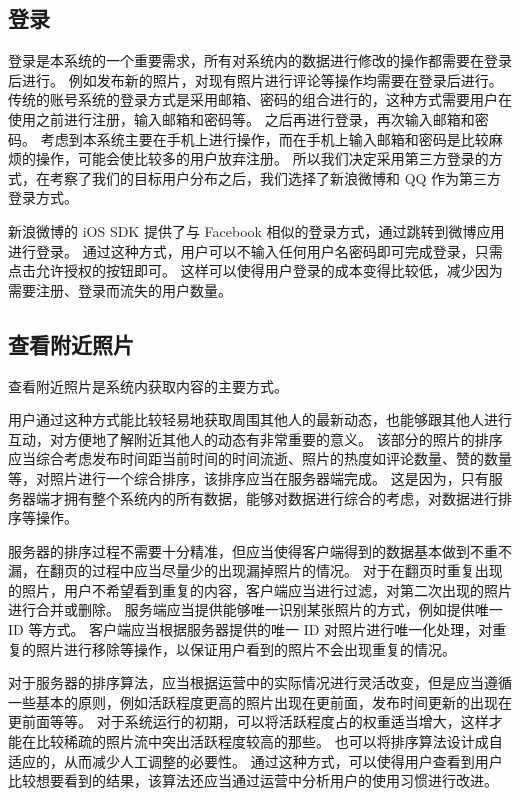 \subsection{登录}

登录是本系统的一个重要需求，所有对系统内的数据进行修改的操作都需要在登录后进行。
例如发布新的照片，对现有照片进行评论等操作均需要在登录后进行。
传统的账号系统的登录方式是采用邮箱、密码的组合进行的，这种方式需要用户在使用之前进行注册，输入邮箱和密码等。
之后再进行登录，再次输入邮箱和密码。
考虑到本系统主要在手机上进行操作，而在手机上输入邮箱和密码是比较麻烦的操作，可能会使比较多的用户放弃注册。
所以我们决定采用第三方登录的方式，在考察了我们的目标用户分布之后，我们选择了新浪微博和 QQ 作为第三方登录方式。

新浪微博的 iOS SDK 提供了与 Facebook 相似的登录方式，通过跳转到微博应用进行登录。
通过这种方式，用户可以不输入任何用户名密码即可完成登录，只需点击允许授权的按钮即可。
这样可以使得用户登录的成本变得比较低，减少因为需要注册、登录而流失的用户数量。

\subsection{查看附近照片}

查看附近照片是系统内获取内容的主要方式。

用户通过这种方式能比较轻易地获取周围其他人的最新动态，也能够跟其他人进行互动，对方便地了解附近其他人的动态有非常重要的意义。
该部分的照片的排序应当综合考虑发布时间距当前时间的时间流逝、照片的热度如评论数量、赞的数量等，对照片进行一个综合排序，该排序应当在服务器端完成。
这是因为，只有服务器端才拥有整个系统内的所有数据，能够对数据进行综合的考虑，对数据进行排序等操作。

服务器的排序过程不需要十分精准，但应当使得客户端得到的数据基本做到不重不漏，在翻页的过程中应当尽量少的出现漏掉照片的情况。
对于在翻页时重复出现的照片，用户不希望看到重复的内容，客户端应当进行过滤，对第二次出现的照片进行合并或删除。
服务端应当提供能够唯一识别某张照片的方式，例如提供唯一 ID 等方式。
客户端应当根据服务器提供的唯一 ID 对照片进行唯一化处理，对重复的照片进行移除等操作，以保证用户看到的照片不会出现重复的情况。

对于服务器的排序算法，应当根据运营中的实际情况进行灵活改变，但是应当遵循一些基本的原则，例如活跃程度更高的照片出现在更前面，发布时间更新的出现在更前面等等。
对于系统运行的初期，可以将活跃程度占的权重适当增大，这样才能在比较稀疏的照片流中突出活跃程度较高的那些。
也可以将排序算法设计成自适应的，从而减少人工调整的必要性。
通过这种方式，可以使得用户查看到用户比较想要看到的结果，该算法还应当通过运营中分析用户的使用习惯进行改进。

